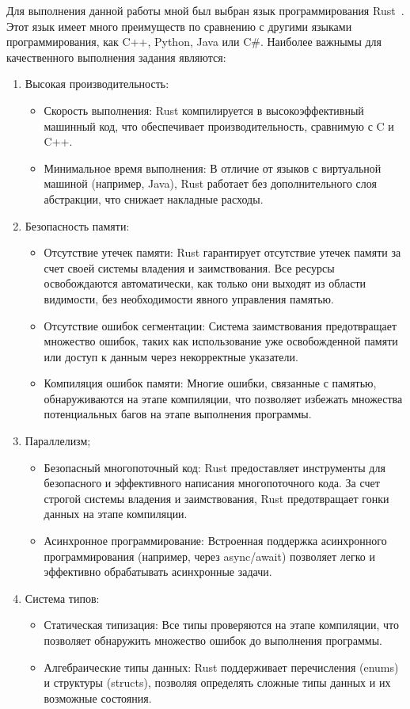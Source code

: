 \documentclass{article}
\begin{document}
Для выполнения данной работы мной был выбран язык программирования Rust~\cite{rust}.
Этот язык имеет много преимуществ по сравнению с другими языками программирования,
как C++, Python, Java или C\#. Наиболее важнымы для качественного выполнения задания являются:

\begin{enumerate}
  \item Высокая производительность:
    \begin{itemize}
      \item Скорость выполнения: Rust компилируется в высокоэффективный машинный код, что обеспечивает производительность, сравнимую с C и C++.
      \item Минимальное время выполнения: В отличие от языков с виртуальной машиной (например, Java), Rust работает без дополнительного слоя абстракции, что снижает накладные расходы.
    \end{itemize}
  \item Безопасность памяти:
    \begin{itemize}
      \item Отсутствие утечек памяти: Rust гарантирует отсутствие утечек памяти за счет своей системы владения и заимствования. Все ресурсы освобождаются автоматически, как только они выходят из области видимости, без необходимости явного управления памятью.
      \item Отсутствие ошибок сегментации: Система заимствования предотвращает множество ошибок, таких как использование уже освобожденной памяти или доступ к данным через некорректные указатели.
      \item Компиляция ошибок памяти: Многие ошибки, связанные с памятью, обнаруживаются на этапе компиляции, что позволяет избежать множества потенциальных багов на этапе выполнения программы.
  \end{itemize}
  \item Параллелизм;
    \begin{itemize}
      \item Безопасный многопоточный код: Rust предоставляет инструменты для безопасного и эффективного написания многопоточного кода. За счет строгой системы владения и заимствования, Rust предотвращает гонки данных на этапе компиляции.
      \item Асинхронное программирование: Встроенная поддержка асинхронного программирования (например, через async/await) позволяет легко и эффективно обрабатывать асинхронные задачи.
    \end{itemize}
  \item Система типов:
  \begin{itemize}
    \item Статическая типизация: Все типы проверяются на этапе компиляции, что позволяет обнаружить множество ошибок до выполнения программы.
    \item Алгебраические типы данных: Rust поддерживает перечисления (enums) и структуры (structs), позволяя определять сложные типы данных и их возможные состояния.
  \end{itemize}
\end{enumerate}
\end{document}

